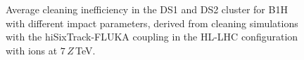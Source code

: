 





\begin{figure}[b]
  \centering
  \caption{Average cleaning inefficiency in the DS1 and DS2 cluster for B1H with different impact parameters, derived from cleaning simulations with the hiSixTrack-FLUKA coupling in the HL-LHC configuration with \lead ions at $7\,Z\,$TeV.}  
  \label{pic:16062203}
  \end{figure}



